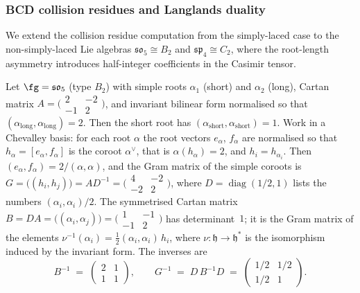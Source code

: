 \subsubsection{BCD collision residues and Langlands duality}
\label{subsubsec:BCD-collision-residues}

We extend the collision residue computation from the simply-laced
case to the non-simply-laced Lie algebras
$\mathfrak{so}_5 \cong B_2$ and $\mathfrak{sp}_4 \cong C_2$,
where the root-length asymmetry introduces half-integer
coefficients in the Casimir tensor.

\begin{computation}
\label{comp:BCD-collision-residues}
Let $\fg = \mathfrak{so}_5$ (type $B_2$) with simple roots
$\alpha_1$ (short) and $\alpha_2$ (long), Cartan matrix
$A = \bigl(\begin{smallmatrix} 2 & -2 \\ -1 & 2 \end{smallmatrix}
\bigr)$,
and invariant bilinear form normalised so that
$(\alpha_{\mathrm{long}}, \alpha_{\mathrm{long}}) = 2$.
Then the short root has
$(\alpha_{\mathrm{short}}, \alpha_{\mathrm{short}}) = 1$.
Work in a Chevalley basis: for each root $\alpha$ the root
vectors $e_\alpha$, $f_\alpha$ are normalised so that
$h_\alpha = [e_\alpha, f_\alpha]$ is the coroot $\alpha^\vee$,
that is $\alpha(h_\alpha) = 2$, and $h_i = h_{\alpha_i}$.
Then $(e_\alpha, f_\alpha) = 2/(\alpha,\alpha)$, and the Gram
matrix of the simple coroots is
$G = \bigl((h_i, h_j)\bigr) = A D^{-1}
= \bigl(\begin{smallmatrix} 4 & -2 \\ -2 & 2 \end{smallmatrix}\bigr)$,
where $D = \operatorname{diag}(1/2, 1)$ lists the numbers
$(\alpha_i,\alpha_i)/2$.
The symmetrised Cartan matrix
$B = DA = \bigl((\alpha_i,\alpha_j)\bigr)
= \bigl(\begin{smallmatrix} 1 & -1 \\ -1 & 2 \end{smallmatrix}\bigr)$
has determinant~$1$; it is the Gram matrix of the elements
$\nu^{-1}(\alpha_i) = \tfrac12(\alpha_i,\alpha_i)\,h_i$,
where $\nu\colon \mathfrak{h} \to \mathfrak{h}^*$ is the
isomorphism induced by the invariant form. The inverses are
\begin{equation}\label{eq:B2-inverse-cartan}
 B^{-1}
 \;=\;
 \begin{pmatrix} 2 & 1 \\ 1 & 1 \end{pmatrix},
 \qquad
 G^{-1} \;=\; D\,B^{-1} D
 \;=\;
 \begin{pmatrix} 1/2 & 1/2 \\ 1/2 & 1 \end{pmatrix}.
\end{equation}


\end{computation}
